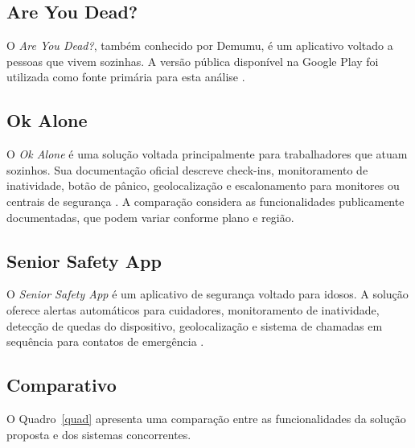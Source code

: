 \subsection{Are You Dead?}

O \textit{Are You Dead?}, também conhecido por Demumu, é um aplicativo voltado a pessoas que vivem sozinhas. A versão pública disponível na Google Play foi utilizada como fonte primária para esta análise \cite{demumu2026}.

\subsection{Ok Alone}

O \textit{Ok Alone} é uma solução voltada principalmente para trabalhadores que atuam sozinhos. Sua documentação oficial descreve check-ins, monitoramento de inatividade, botão de pânico, geolocalização e escalonamento para monitores ou centrais de segurança \cite{okalone2026}. A comparação considera as funcionalidades publicamente documentadas, que podem variar conforme plano e região.

\subsection{Senior Safety App}

O \textit{Senior Safety App} é um aplicativo de segurança voltado para idosos. A solução oferece alertas automáticos para cuidadores, monitoramento de inatividade, detecção de quedas do dispositivo, geolocalização e sistema de chamadas em sequência para contatos de emergência \cite{seniorsafetyapp}.

\subsection{Comparativo}

O Quadro~\ref{quad} apresenta uma comparação entre as funcionalidades da solução proposta e dos sistemas concorrentes.

